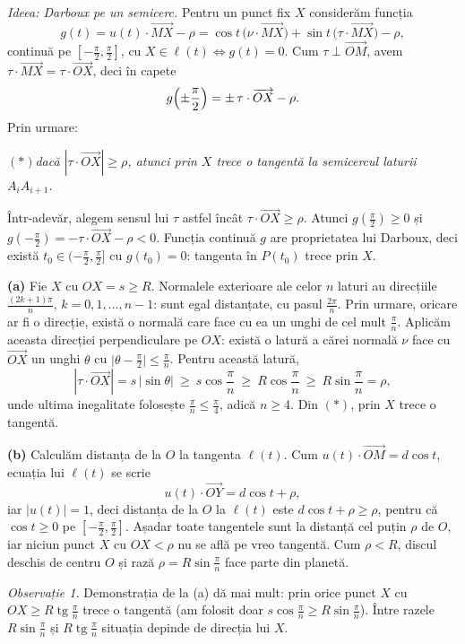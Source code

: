\emph{Ideea: Darboux pe un semicerc.} Pentru un punct fix $X$ considerăm funcția
\[ g(t)=u(t)\cdot\overrightarrow{MX}-\rho=\cos t\,\bigl(\nu\cdot\overrightarrow{MX}\bigr)+\sin t\,\bigl(\tau\cdot\overrightarrow{MX}\bigr)-\rho , \]
continuă pe $[-\frac\pi2,\frac\pi2]$, cu $X\in\ell(t)\iff g(t)=0$. Cum $\tau\perp\overrightarrow{OM}$, avem $\tau\cdot\overrightarrow{MX}=\tau\cdot\overrightarrow{OX}$, deci în capete
\[ g\Bigl(\pm\frac\pi2\Bigr)=\pm\,\tau\cdot\overrightarrow{OX}-\rho . \]
Prin urmare:
\begin{center}
$(*)$\quad \emph{dacă $|\tau\cdot\overrightarrow{OX}|\ge\rho$, atunci prin $X$ trece o tangentă la semicercul laturii $A_iA_{i+1}$.}
\end{center}
Într-adevăr, alegem sensul lui $\tau$ astfel încât $\tau\cdot\overrightarrow{OX}\ge\rho$. Atunci $g(\frac\pi2)\ge0$ și $g(-\frac\pi2)=-\tau\cdot\overrightarrow{OX}-\rho<0$. Funcția continuă $g$ are proprietatea lui Darboux, deci există $t_0\in(-\frac\pi2,\frac\pi2]$ cu $g(t_0)=0$: tangenta în $P(t_0)$ trece prin $X$.

\textbf{(a)} Fie $X$ cu $OX=s\ge R$. Normalele exterioare ale celor $n$ laturi au direcțiile $\frac{(2k+1)\pi}{n}$, $k=0,1,\dots,n-1$: sunt egal distanțate, cu pasul $\frac{2\pi}{n}$. Prin urmare, oricare ar fi o direcție, există o normală care face cu ea un unghi de cel mult $\frac\pi n$. Aplicăm aceasta direcției perpendiculare pe $OX$: există o latură a cărei normală $\nu$ face cu $\overrightarrow{OX}$ un unghi $\theta$ cu $\bigl|\theta-\frac\pi2\bigr|\le\frac\pi n$. Pentru această latură,
\[ |\tau\cdot\overrightarrow{OX}|=s\,|\sin\theta|\ \ge\ s\cos\frac{\pi}{n}\ \ge\ R\cos\frac{\pi}{n}\ \ge\ R\sin\frac{\pi}{n}=\rho , \]
unde ultima inegalitate folosește $\frac\pi n\le\frac\pi4$, adică $n\ge4$. Din $(*)$, prin $X$ trece o tangentă.

\textbf{(b)} Calculăm distanța de la $O$ la tangenta $\ell(t)$. Cum $u(t)\cdot\overrightarrow{OM}=d\cos t$, ecuația lui $\ell(t)$ se scrie
\[ u(t)\cdot\overrightarrow{OY}=d\cos t+\rho , \]
iar $|u(t)|=1$, deci distanța de la $O$ la $\ell(t)$ este $d\cos t+\rho\ge\rho$, pentru că $\cos t\ge0$ pe $[-\frac\pi2,\frac\pi2]$. Așadar toate tangentele sunt la distanță cel puțin $\rho$ de $O$, iar niciun punct $X$ cu $OX<\rho$ nu se află pe vreo tangentă. Cum $\rho<R$, discul deschis de centru $O$ și rază $\rho=R\sin\frac\pi n$ face parte din planetă.

\emph{Observație 1.} Demonstrația de la (a) dă mai mult: prin orice punct $X$ cu $OX\ge R\operatorname{tg}\frac{\pi}{n}$ trece o tangentă (am folosit doar $s\cos\frac\pi n\ge R\sin\frac\pi n$). Între razele $R\sin\frac\pi n$ și $R\operatorname{tg}\frac\pi n$ situația depinde de direcția lui $X$.

